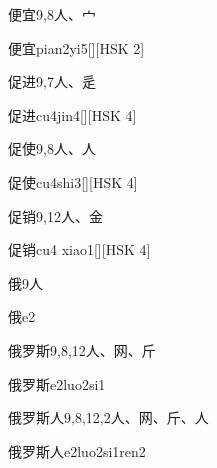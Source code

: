 \begin{entry}{便宜}{9,8}{⼈、⼧}
  \begin{phonetics}{便宜}{pian2yi5}[][HSK 2]
  \end{phonetics}
\end{entry}

\begin{entry}{促进}{9,7}{⼈、⾡}
  \begin{phonetics}{促进}{cu4jin4}[][HSK 4]
  \end{phonetics}
\end{entry}

\begin{entry}{促使}{9,8}{⼈、⼈}
  \begin{phonetics}{促使}{cu4shi3}[][HSK 4]
  \end{phonetics}
\end{entry}

\begin{entry}{促销}{9,12}{⼈、⾦}
  \begin{phonetics}{促销}{cu4 xiao1}[][HSK 4]
  \end{phonetics}
\end{entry}

\begin{entry}{俄}{9}{⼈}
  \begin{phonetics}{俄}{e2}
  \end{phonetics}
\end{entry}

\begin{entry}{俄罗斯}{9,8,12}{⼈、⽹、⽄}
  \begin{phonetics}{俄罗斯}{e2luo2si1}
  \end{phonetics}
\end{entry}

\begin{entry}{俄罗斯人}{9,8,12,2}{⼈、⽹、⽄、⼈}
  \begin{phonetics}{俄罗斯人}{e2luo2si1ren2}
  \end{phonetics}
\end{entry}

